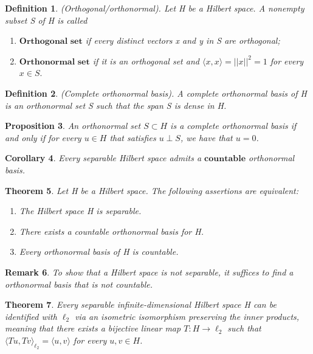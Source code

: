 \documentclass[twoside]{article}
\newcounter{lecnum}
\newtheorem{theorem}{Theorem}[lecnum]
\newtheorem{proposition}[theorem]{Proposition}
\newtheorem{corollary}[theorem]{Corollary}
\newtheorem{definition}[theorem]{Definition}
\newtheorem{remark}[theorem]{Remark}
\begin{document}
\begin{definition}(Orthogonal/orthonormal). Let H be a Hilbert space. A nonempty subset S of H is called 
\begin{enumerate}
\item $\textbf{Orthogonal set}$ if every distinct vectors x and y in S are orthogonal;
\item $\textbf{Orthonormal set}$ if it is an orthogonal set and $\langle x, x \rangle = ||x||^2 = 1$ for every $x \in S.$
\end{enumerate}
\end{definition}

\begin{definition}(Complete orthonormal basis). A complete orthonormal basis of H is an orthonormal set S such that the span S is dense in H.
\end{definition}

\begin{proposition}An orthonormal set $S \subset H$ is a complete orthonormal basis if and only if for every $u \in H$ that satisfies $u \perp S$, we have that $u = 0$.
\end{proposition}

\begin{corollary}Every separable Hilbert space admits a $\textbf{countable}$ orthonormal basis.
\end{corollary}

\begin{theorem}Let H be a Hilbert space. The following assertions are equivalent:
\begin{enumerate}
\item The Hilbert space H is separable.
\item There exists a countable orthonormal basis for H.
\item Every orthonormal basis of H is countable.
\end{enumerate}
\end{theorem}
\begin{remark}To show that a Hilbert space is not separable, it suffices to find a orthonormal basis that is not countable.
\end{remark}

\begin{theorem}Every separable infinite-dimensional Hilbert space H can be identified with $\ell_2$ via an isometric isomorphism preserving the inner products, meaning that there exists a bijective linear map $T:H \rightarrow \ell_2$ such that $\langle Tu, Tv \rangle_{\ell_{2}} = \langle u, v \rangle$ for every $u, v \in H$. 
\end{theorem}
\end{document}
